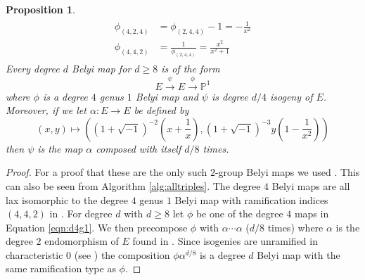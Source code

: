 \documentclass{dcthesis}
\newcommand{\PP}{\mathbb P}
\numberwithin{equation}{section}
\newtheorem{prop}[equation]{Proposition}
\theoremstyle{definition}
\theoremstyle{remark}
\begin{document}
{{\begin{prop}
\begin{align}
\begin{split}
          \phi_{(4,2,4)} &= \phi_{(2,4,4)} - 1=-\frac{1}{x^2}\\
          \phi_{(4,4,2)} &= \frac{1}{\phi_{(2,4,4)}} = \frac{x^2}{x^2+1}
        \end{split}
      \end{align}
      Every degree $d$ Belyi map
      for $d\geq 8$ is of the form
      \[
        E\stackrel{\psi}{\to}E\stackrel{\phi}{\to}\PP^1
      \]
      where $\phi$ is a degree $4$ genus $1$ Belyi map
      and $\psi$ is degree $d/4$ isogeny of $E$.
      Moreover,
      if we let $\alpha\colon E\to E$ be defined by
      \begin{equation}\label{eqn:alpha}
        (x,y)\mapsto
        \left(
          (1+\sqrt{-1})^{-2}\left(x+\frac{1}{x}\right),
          (1+\sqrt{-1})^{-3}y\left(1-\frac{1}{x^2}\right)
        \right)
      \end{equation}
      then $\psi$ is the map $\alpha$ composed with itself
      $d/8$ times.
    \end{prop}
    \begin{proof}
      For a proof that these are the only such $2$-group Belyi maps
      we used \cite[Lemma 3.5]{triangles}.
      This can also be seen from Algorithm \ref{alg:alltriples}.
      The degree $4$ Belyi maps are all lax isomorphic
      to the degree $4$ genus $1$ Belyi map with
      ramification indices $(4,4,2)$ in
      \cite{belyidb}.
      For degree $d$ with $d\geq 8$
      let $\phi$ be one of the degree $4$ maps in
      Equation \ref{eqn:d4g1}.
      We then precompose
      $\phi$
      with $\alpha\cdots\alpha$ ($d/8$ times)
      where $\alpha$ is the
      degree $2$ endomorphism of $E$
      found in
      \cite[Proposition 2.3.1]{advancedsilverman}.
      Since isogenies are unramified
      in characteristic $0$
      (see \cite[Chapter III, Theorem 4.10]{silverman})
      the composition $\phi\alpha^{d/8}$
      is a degree $d$ Belyi map with the same ramification type as $\phi$.
    \end{proof}
  }
}
\end{document}
